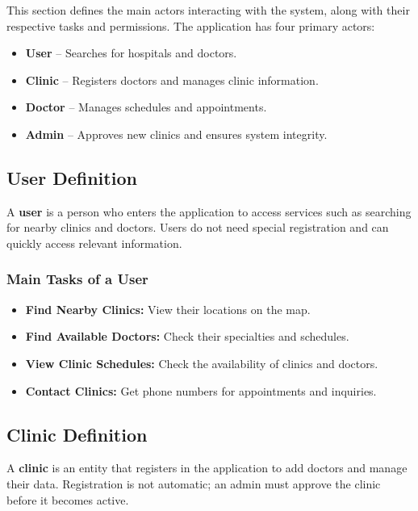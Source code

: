 \documentclass[12pt]{report}
\begin{document}
\noindent This section defines the main actors interacting with the system, along with their respective tasks and permissions. The application has four primary actors:
\begin{itemize}
	\item \textbf{User} – Searches for hospitals and doctors.
	\item \textbf{Clinic} – Registers doctors and manages clinic information.
	\item \textbf{Doctor} – Manages schedules and appointments.
	\item \textbf{Admin} – Approves new clinics and ensures system integrity.
\end{itemize}

\subsection{\textbf{User Definition}}
\noindent A \textbf{user} is a person who enters the application to access services such as searching for nearby clinics and doctors. Users do not need special registration and can quickly access relevant information.

\subsubsection{\textbf{Main Tasks of a User}}
\begin{itemize}
	\item \textbf{Find Nearby Clinics:} View their locations on the map.
	\item \textbf{Find Available Doctors:} Check their specialties and schedules.
	\item \textbf{View Clinic Schedules:} Check the availability of clinics and doctors.
	\item \textbf{Contact Clinics:} Get phone numbers for appointments and inquiries.
\end{itemize}

\vspace{0.5cm}

\subsection{\textbf{Clinic Definition}}

\noindent A \textbf{clinic} is an entity that registers in the application to add doctors and manage their data. Registration is not automatic; an admin must approve the clinic before it becomes active.
\end{document}
